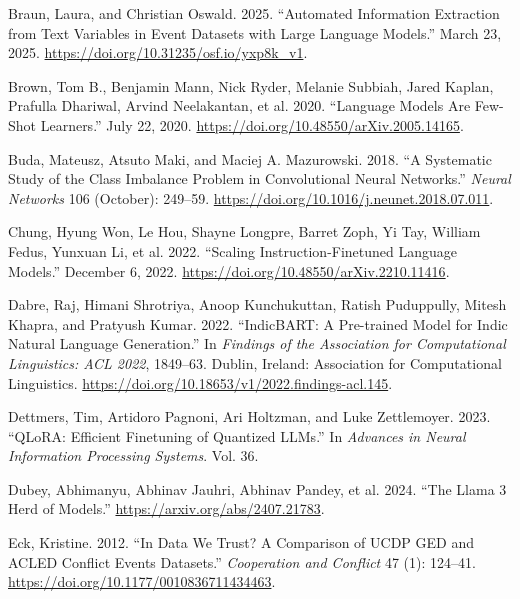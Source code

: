 \documentclass[
  11pt,
]{article}
\newlength{\cslhangindent}
\newenvironment{CSLReferences}[2] %
 {\begin{list}{}{%
  \setlength{\itemindent}{0pt}
  \setlength{\leftmargin}{0pt}
  \setlength{\parsep}{0pt}
  \ifodd #1
   \setlength{\leftmargin}{\cslhangindent}
   \setlength{\itemindent}{-1\cslhangindent}
  \fi
  \setlength{\itemsep}{#2\baselineskip}}}
 {\end{list}}
\begin{document}
\setlength{\parindent}{-0.2in}
\setlength{\leftskip}{0.2in}
\setlength{\parskip}{8pt}
\noindent

\label{refs}
\begin{CSLReferences}{1}{0}
Braun, Laura, and Christian Oswald. 2025. {``Automated Information
Extraction from Text Variables in Event Datasets with Large Language
Models.''} March 23, 2025.
\url{https://doi.org/10.31235/osf.io/yxp8k_v1}.

Brown, Tom B., Benjamin Mann, Nick Ryder, Melanie Subbiah, Jared Kaplan,
Prafulla Dhariwal, Arvind Neelakantan, et al. 2020. {``Language {Models}
Are {Few-Shot Learners}.''} July 22, 2020.
\url{https://doi.org/10.48550/arXiv.2005.14165}.

Buda, Mateusz, Atsuto Maki, and Maciej A. Mazurowski. 2018. {``A
Systematic Study of the Class Imbalance Problem in Convolutional Neural
Networks.''} \emph{Neural Networks} 106 (October): 249--59.
\url{https://doi.org/10.1016/j.neunet.2018.07.011}.

Chung, Hyung Won, Le Hou, Shayne Longpre, Barret Zoph, Yi Tay, William
Fedus, Yunxuan Li, et al. 2022. {``Scaling {Instruction-Finetuned
Language Models}.''} December 6, 2022.
\url{https://doi.org/10.48550/arXiv.2210.11416}.

Dabre, Raj, Himani Shrotriya, Anoop Kunchukuttan, Ratish Puduppully,
Mitesh Khapra, and Pratyush Kumar. 2022. {``{IndicBART}: {A Pre-trained
Model} for {Indic Natural Language Generation}.''} In \emph{Findings of
the {Association} for {Computational Linguistics}: {ACL} 2022},
1849--63. Dublin, Ireland: Association for Computational Linguistics.
\url{https://doi.org/10.18653/v1/2022.findings-acl.145}.

Dettmers, Tim, Artidoro Pagnoni, Ari Holtzman, and Luke Zettlemoyer.
2023. {``{QLoRA}: {Efficient} Finetuning of Quantized {LLMs}.''} In
\emph{Advances in Neural Information Processing Systems}. Vol. 36.

Dubey, Abhimanyu, Abhinav Jauhri, Abhinav Pandey, et al. 2024. {``The
Llama 3 Herd of Models.''} \url{https://arxiv.org/abs/2407.21783}.

Eck, Kristine. 2012. {``In Data We Trust? {A} Comparison of {UCDP GED}
and {ACLED} Conflict Events Datasets.''} \emph{Cooperation and Conflict}
47 (1): 124--41. \url{https://doi.org/10.1177/0010836711434463}.


\end{CSLReferences}
\end{document}
